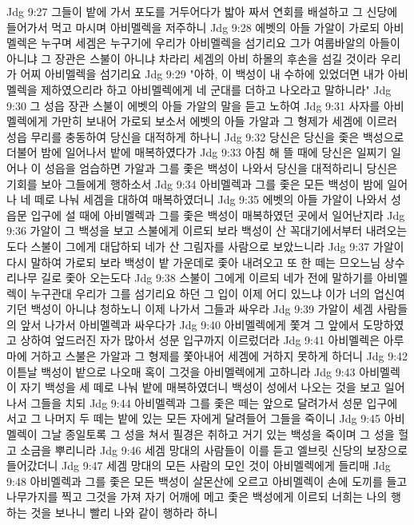 Jdg 9:27  그들이 밭에 가서 포도를 거두어다가 밟아 짜서 연회를 배설하고 그 신당에 들어가서 먹고 마시며 아비멜렉을 저주하니
Jdg 9:28  에벳의 아들 가알이 가로되 아비멜렉은 누구며 세겜은 누구기에 우리가 아비멜렉을 섬기리요 그가 여룹바알의 아들이 아니냐 그 장관은 스불이 아니냐 차라리 세겜의 아비 하몰의 후손을 섬길 것이라 우리가 어찌 아비멜렉을 섬기리요
Jdg 9:29  "아하, 이 백성이 내 수하에 있었더면 내가 아비멜렉을 제하였으리라 하고 아비멜렉에게 네 군대를 더하고 나오라고 말하니라"
Jdg 9:30  그 성읍 장관 스불이 에벳의 아들 가알의 말을 듣고 노하여
Jdg 9:31  사자를 아비멜렉에게 가만히 보내어 가로되 보소서 에벳의 아들 가알과 그 형제가 세겜에 이르러 성읍 무리를 충동하여 당신을 대적하게 하나니
Jdg 9:32  당신은 당신을 좇은 백성으로 더불어 밤에 일어나서 밭에 매복하였다가
Jdg 9:33  아침 해 뜰 때에 당신은 일찌기 일어나 이 성읍을 엄습하면 가알과 그를 좇은 백성이 나와서 당신을 대적하리니 당신은 기회를 보아 그들에게 행하소서
Jdg 9:34  아비멜렉과 그를 좇은 모든 백성이 밤에 일어나 네 떼로 나눠 세겜을 대하여 매복하였더니
Jdg 9:35  에벳의 아들 가알이 나와서 성읍문 입구에 설 때에 아비멜렉과 그를 좇은 백성이 매복하였던 곳에서 일어난지라
Jdg 9:36  가알이 그 백성을 보고 스불에게 이르되 보라 백성이 산 꼭대기에서부터 내려오는도다 스불이 그에게 대답하되 네가 산 그림자를 사람으로 보았느니라
Jdg 9:37  가알이 다시 말하여 가로되 보라 백성이 밭 가운데로 좇아 내려오고 또 한 떼는 므오느님 상수리나무 길로 좇아 오는도다
Jdg 9:38  스불이 그에게 이르되 네가 전에 말하기를 아비멜렉이 누구관대 우리가 그를 섬기리요 하던 그 입이 이제 어디 있느냐 이가 너의 업신여기던 백성이 아니냐 청하노니 이제 나가서 그들과 싸우라
Jdg 9:39  가알이 세겜 사람들의 앞서 나가서 아비멜렉과 싸우다가
Jdg 9:40  아비멜렉에게 쫓겨 그 앞에서 도망하였고 상하여 엎드러진 자가 많아서 성문 입구까지 이르렀더라
Jdg 9:41  아비멜렉은 아루마에 거하고 스불은 가알과 그 형제를 쫓아내어 세겜에 거하지 못하게 하더니
Jdg 9:42  이튿날 백성이 밭으로 나오매 혹이 그것을 아비멜렉에게 고하니라
Jdg 9:43  아비멜렉이 자기 백성을 세 떼로 나눠 밭에 매복하였더니 백성이 성에서 나오는 것을 보고 일어나서 그들을 치되
Jdg 9:44  아비멜렉과 그를 좇은 떼는 앞으로 달려가서 성문 입구에 서고 그 나머지 두 떼는 밭에 있는 모든 자에게 달려들어 그들을 죽이니
Jdg 9:45  아비멜렉이 그날 종일토록 그 성을 쳐서 필경은 취하고 거기 있는 백성을 죽이며 그 성을 헐고 소금을 뿌리니라
Jdg 9:46  세겜 망대의 사람들이 이를 듣고 엘브릿 신당의 보장으로 들어갔더니
Jdg 9:47  세겜 망대의 모든 사람의 모인 것이 아비멜렉에게 들리매
Jdg 9:48  아비멜렉과 그를 좇은 모든 백성이 살몬산에 오르고 아비멜렉이 손에 도끼를 들고 나무가지를 찍고 그것을 가져 자기 어깨에 메고 좇은 백성에게 이르되 너희는 나의 행하는 것을 보나니 빨리 나와 같이 행하라 하니
